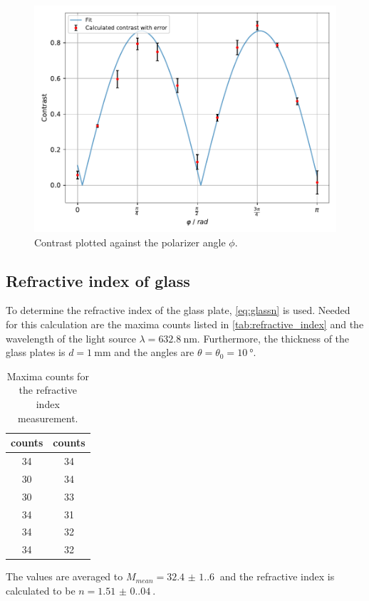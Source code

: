 \begin{figure}[H]
  \centering
  \includegraphics[width=\textwidth]{build/contrast.pdf}
  \caption{Contrast plotted against the polarizer angle $\phi$.}
  \label{fig:contrast}
\end{figure}

\newpage

\subsection{Refractive index of glass}
To determine the refractive index of the glass plate, \autoref{eq:glassn} is used. 
Needed for this calculation are the maxima counts listed in \autoref{tab:refractive_index} and the wavelength of the light source $\lambda = \SI{632.8}{\nano\meter}$.
Furthermore, the thickness of the glass plates is $d = \SI{1}{\milli\meter}$ and the angles are $\theta = \theta_0 = \SI{10}{\degree}$.
\begin{table}[H]
  \centering
  \begin{tabular}{c|c}\hline
    \hline
    counts & counts \\ \hline
    34 & 34 \\ \hline
    30 & 34 \\ \hline
    30 & 33 \\ \hline
    34 & 31 \\ \hline
    34 & 32 \\ \hline
    34 & 32 \\ \hline
  \end{tabular}
  \caption{Maxima counts for the refractive index measurement.}
  \label{tab:refractive_index}
\end{table}
The values are averaged to $M_{mean} = \SI{32.4(1.6)}{}$ and the refractive index is calculated to be $n = \SI{1.51(0.04)}{}$.
\newpage
